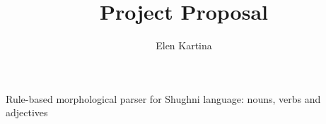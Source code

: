 \newcommand*{\rootdir}{./diploma}%



\title{\textbf{Project Proposal}}
\author{Elen Kartina}
\date{}


    \maketitle
    \thispagestyle{empty}
    \vspace{6cm}
    \begin{center}
        \LARGE Rule-based morphological parser for Shughni language: nouns, verbs and adjectives
    \end{center}
    \newpage

    \setcounter{page}{1}
    \tableofcontents
    \newpage


